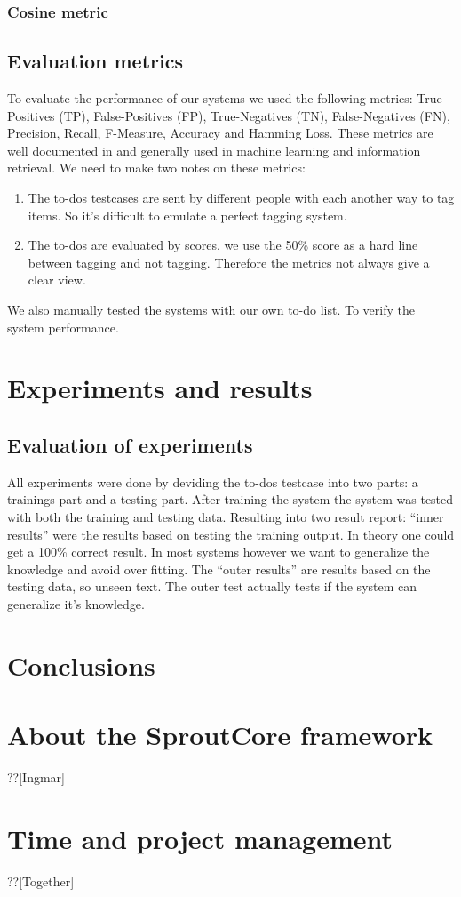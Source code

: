 \documentclass[a4paper,titlepage]{article}
\begin{document}
\subsubsection{Cosine metric}
\subsection{Evaluation metrics}
To evaluate the performance of our systems we used the following metrics: True-Positives (TP), False-Positives (FP), True-Negatives (TN), False-Negatives (FN), Precision, Recall, F-Measure, Accuracy and Hamming Loss. These metrics are well documented in \cite{Francis99performancemeasures} and generally used in machine learning and information retrieval. We need to make two notes on these metrics:
\begin{enumerate}
 \item The to-dos testcases are sent by different people with each another way to tag items. So it's difficult to emulate a perfect tagging system.
 \item The to-dos are evaluated by scores, we use the 50\% score as a hard line between tagging and not tagging. Therefore the metrics not always give a clear view.
\end{enumerate}
We also manually tested the systems with our own to-do list. To verify the system performance.
\section{Experiments and results}
\subsection{Evaluation of experiments}
All experiments were done by deviding the to-dos testcase into two parts: a trainings part and a testing part. After training the system the system was tested with both the training and testing data. Resulting into two result report: ``inner results'' were the results based on testing the training output. In theory one could get a 100\% correct result. In most systems however we want to generalize the knowledge and avoid over fitting. The ``outer results'' are results based on the testing data, so unseen text. The outer test actually tests if the system can generalize it's knowledge.
\section{Conclusions}
\section{About the SproutCore framework}
??[Ingmar]
\section{Time and project management}
??[Together]
\nocite{*}


\end{document}
